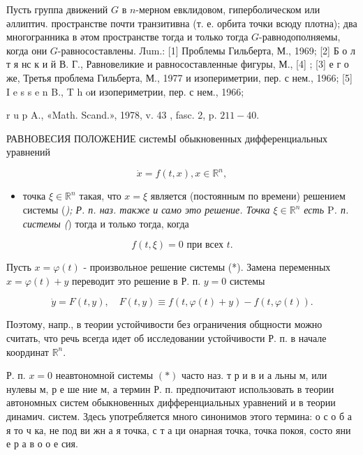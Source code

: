 \documentclass[10pt]{article}
\begin{document}
Пусть группа движений $G$ в $n$-мерном евклидовом, гиперболическом или әллиптич. пространстве почти транзитивна (т. е. орбита точки всюду плотна); два многогранника в әтом пространстве тогда и только тогда $G$-равнодополняемы, когда они $G$-равносоставлены. Лum.: [1] Проблемы Гильберта, М., 1969; [2] Б о л т я нс к и й В. Г., Равновеликие и равносоставленные фигуры, М., [4] ; [3] е г о же, Третья проблема Гильберта, М., 1977 и изопериметрии, пер. с нем., 1966; [5] I e s s e n B., T h oи изопериметрии, пер. с нем., 1966;

r u p A., «Math. Scand.», 1978, v. 43 , fasc. 2, p. $211-40$.



РАВНОВЕСИЯ ПОЛОЖЕНИЕ системЫ обыкновенных дифференциальных уравнений



\[

\dot{x}=f(t, x), x \in \mathbb{R}^{n},

\]



\begin{itemize}

  \item точка $\xi \in \mathbb{R}^{n}$ такая, что $x=\xi$ является (постоянным по времени) решением системы (\textit{); Р. п. наз. также и само это решение. Точка $\xi \in \mathbb{R}^{n}$ есть $\mathrm{P}$. п. системы (}) тогда и только тогда, когда

\end{itemize}



\[

f(t, \xi)=0 \text { при всех } t .

\]



Пусть $x=\varphi(t)$ - произвольное решение системы (*). Замена переменных $x=\varphi(t)+y$ переводит это решение в Р. п. $y=0$ системы



\[

\dot{y}=F(t, y), \quad F(t, y) \equiv f(t, \varphi(t)+y)-f(t, \varphi(t)) .

\]



Поэтому, напр., в теории устойчивости без ограничения общности можно считать, что речь всегда идет об исследовании устойчивости Р. п. в начале координат $\mathbb{R}^{n}$.



Р. п. $x=0$ неавтономной системы $(*)$ часто наз. т р и в и а льны м, или нулевы м, р е ше ние м, а термин Р. п. предпочитают использовать в теории автономных систем обыкновенных дифференциальных уравнений и в теории динамич. систем. Здесь употребляется много синонимов этого термина: о с о б а я то ч ка, не под ви жн а я точка, с т а ци онарная точка, точка покоя, состо яни е р а в о о е сия.
\end{document}
